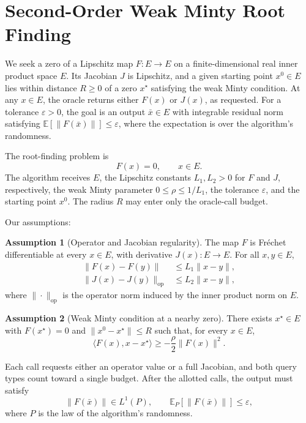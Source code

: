 \documentclass[10pt]{article}
\theoremstyle{definition}
\newtheorem{assumption}{Assumption}
\begin{document}
\section*{Second-Order Weak Minty Root Finding}
We seek a zero of a Lipschitz map $F:E\to E$ on a finite-dimensional real inner product space $E$. Its Jacobian $J$ is Lipschitz, and a given starting point $x^0\in E$ lies within distance $R\geq 0$ of a zero $x^\star$ satisfying the weak Minty condition. At any $x\in E$, the oracle returns either $F(x)$ or $J(x)$, as requested. For a tolerance $\varepsilon>0$, the goal is an output $\bar{x}\in E$ with integrable residual norm satisfying $\mathbb{E}[\|F(\bar{x})\|]\leq\varepsilon$, where the expectation is over the algorithm's randomness.

The root-finding problem is
\[
F(x)=0,\qquad x\in E.
\]
The algorithm receives $E$, the Lipschitz constants $L_1,L_2>0$ for $F$ and $J$, respectively, the weak Minty parameter $0\leq\rho\leq 1/L_1$, the tolerance $\varepsilon$, and the starting point $x^0$. The radius $R$ may enter only the oracle-call budget.

Our assumptions:
\begin{assumption}[Operator and Jacobian regularity]
The map $F$ is Fr\'echet differentiable at every $x\in E$, with derivative $J(x):E\to E$. For all $x,y\in E$,
\[
\begin{aligned}
\|F(x)-F(y)\| &\leq L_1\|x-y\|,\\
\|J(x)-J(y)\|_{\mathrm{op}} &\leq L_2\|x-y\|,
\end{aligned}
\]
where $\|\cdot\|_{\mathrm{op}}$ is the operator norm induced by the inner product norm on $E$.
\end{assumption}

\begin{assumption}[Weak Minty condition at a nearby zero]
There exists $x^\star\in E$ with $F(x^\star)=0$ and $\|x^0-x^\star\|\leq R$ such that, for every $x\in E$,
\[
\langle F(x),x-x^\star\rangle \geq -\frac{\rho}{2}\|F(x)\|^2.
\]
\end{assumption}

Each call requests either an operator value or a full Jacobian, and both query types count toward a single budget. After the allotted calls, the output must satisfy
\[
\|F(\bar{x})\|\in L^1(P),\qquad
\mathbb{E}_{P}[\|F(\bar{x})\|]\leq\varepsilon,
\]
where $P$ is the law of the algorithm's randomness.
\end{document}

